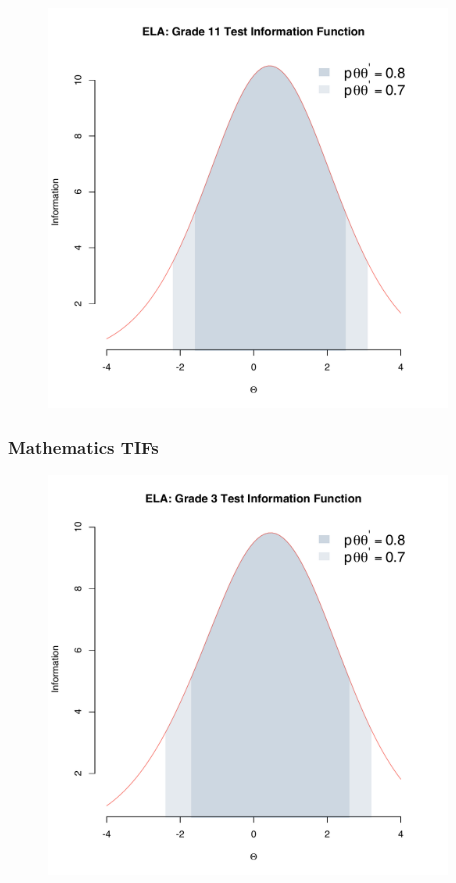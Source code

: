 \documentclass[]{article}
\begin{document}
\begin{figure}
\centering
\includegraphics[height=4.16667in]{tifs/ela11tif.pdf}
\caption{}
\end{figure}

\subsubsection{Mathematics TIFs}\label{mathematics-tifs}

\begin{figure}
\centering
\includegraphics[height=4.16667in]{tifs/ela3tif.pdf}
\caption{}
\end{figure}
\end{document}
